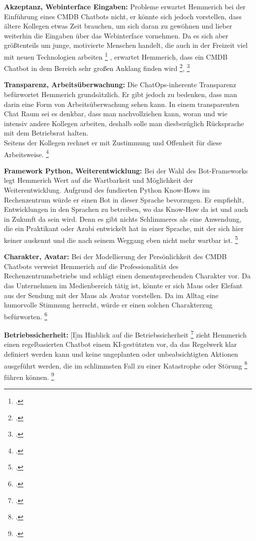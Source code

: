 \textbf{Akzeptanz, Webinterface Eingaben: }Probleme erwartet Hemmerich bei der Einführung eines \acs{CMDB} Chatbots nicht, er könnte sich jedoch vorstellen, dass ältere Kollegen etwas Zeit brauchen, um sich daran zu gewöhnen und lieber weiterhin die Eingaben über das Webinterface vornehmen. 
Da es sich aber größtenteils um junge, motivierte Menschen handelt, \glqq{}die auch in der Freizeit viel mit neuen Technologien arbeiten\grqq
\footcite[][o. \pno]{Hemm_2019}
, erwartet Hemmerich, dass ein \acs{CMDB} Chatbot \glqq{}in dem Bereich sehr großen Anklang finden wird\grqq
\footcite[][o. \pno]{Hemm_2019},
\footcite[Vgl.][o. \pno]{Hemm_2019}

\textbf{Transparenz, Arbeitsüberwachung: }Die ChatOps-inherente Transparenz befürwortet Hemmerich grundsätzlich. Er gibt jedoch zu bedenken, dass man darin eine Form von Arbeitsüberwachung sehen kann. In einem transparenten Chat Raum sei es denkbar, dass man nachvollziehen kann, woran und wie intensiv andere Kollegen arbeiten, deshalb solle man diesbezüglich Rücksprache mit dem Betriebsrat halten.\\
Seitens der Kollegen rechnet er mit Zustimmung und Offenheit für diese Arbeitsweise. 
\footcite[Vgl.][o. \pno]{Hemm_2019}

\textbf{Framework Python, Weiterentwicklung: }Bei der Wahl des Bot-Frameworks legt Hemmerich Wert auf die Wartbarkeit und Möglichkeit der Weiterentwicklung. Aufgrund des fundierten Python Know-Hows im Rechenzentrum würde er einen Bot in dieser Sprache bevorzugen. Er empfiehlt, \glqq{}Entwicklungen in den Sprachen zu betreiben, wo das Know-How da ist und auch in Zukunft da sein wird. Denn es gibt nichts Schlimmeres als eine Anwendung, die ein Praktikant oder Azubi entwickelt hat in einer Sprache, mit der sich hier keiner auskennt und die nach seinem Weggang eben nicht mehr wartbar ist.\grqq
\footcites[][o. \pno]{Hemm_2019}[Vgl.][o. \pno]{Hemm_2019}

\textbf{Charakter, Avatar: }Bei der Modellierung der Persönlichkeit des \acs{CMDB} Chatbots verweist Hemmerich auf die Professionalität des Rechenzentrumsbetriebs und schlägt einen dementsprechenden Charakter vor. Da das Unternehmen im Medienbereich tätig ist, könnte er sich Maus oder Elefant aus der Sendung mit der Maus als Avatar vorstellen. Da im Alltag eine humorvolle Stimmung herrscht, würde er einen solchen Charakterzug befürworten.  
\footcite[Vgl.][o. \pno]{Hemm_2019}

\textbf{Betriebssicherheit: }\glqq{}[I]m Hinblick auf die Betriebssicherheit\grqq
\footcite[][o. \pno]{Hemm_2019}
zieht Hemmerich einen regelbasierten Chatbot einem KI-gestützten vor, da das Regelwerk klar definiert werden kann und keine ungeplanten oder unbeabsichtigten Aktionen ausgeführt werden, die im schlimmsten Fall zu \glqq{}einer Katastrophe oder Störung\grqq 
\footcite[][o. \pno]{Hemm_2019}
 führen können. 
\footcite[Vgl.][o. \pno]{Hemm_2019}


